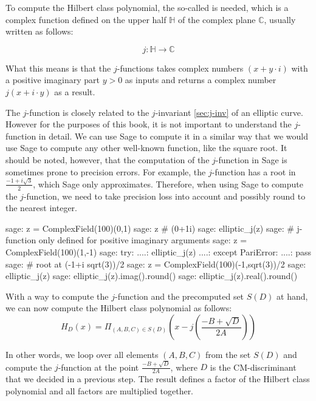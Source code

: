 To compute the Hilbert class polynomial, the so-called  is needed, which is a complex function defined on the upper half $\mathbb{H}$ of the complex plane $\mathbb{C}$, usually written as follows:

\begin{equation}\label{eq:j-invariant2}
j: \mathbb{H} \to \mathbb{C}
\end{equation}

What this means is that the $j$-functions takes complex numbers $(x +y\cdot i)$ with a positive imaginary part $y>0$ as inputs and returns a complex number $j(x+i\cdot y)$ as a result.

The $j$-function is closely related to the $j$-invariant \ref{sec:j-inv} of an elliptic curve. However for the purposes of this book, it is not important to understand the $j$-function in detail. We can use Sage to compute it in a similar way that we would use Sage to compute any other well-known function, like the square root. It should be noted, however, that the computation of the $j$-function in Sage is sometimes prone to precision errors. For example, the $j$-function has a root in $\frac{-1+i\sqrt{3}}{2}$, which Sage only approximates. Therefore, when using Sage to compute the $j$-function, we need to take precision loss into account and possibly round to the nearest integer.

\begin{sagecommandline}
sage: z = ComplexField(100)(0,1)
sage: z # (0+1i)
sage: elliptic_j(z)
sage: # j-function only defined for positive imaginary arguments
sage: z = ComplexField(100)(1,-1)
sage: try:
....:     elliptic_j(z)
....: except PariError:
....:     pass
sage: # root at (-1+i sqrt(3))/2
sage: z = ComplexField(100)(-1,sqrt(3))/2
sage: elliptic_j(z)
sage: elliptic_j(z).imag().round()
sage: elliptic_j(z).real().round()
\end{sagecommandline}

With a way to compute the $j$-function and the precomputed set $S(D)$ at hand, we can now compute the Hilbert class polynomial as follows:
\begin{equation}
H_D(x) = \Pi_{(A,B,C)\in S(D)} \left(x - j\left(\frac{-B + \sqrt{D}}{2A}\right)\right)
\end{equation}

In other words, we loop over all elements $(A,B,C)$ from the set $S(D)$ and compute the $j$-function at the point $\frac{-B + \sqrt{D}}{2A}$, where $D$ is the CM-discriminant that we decided in a previous step. The result defines a factor of the Hilbert class polynomial and all factors are multiplied together.

